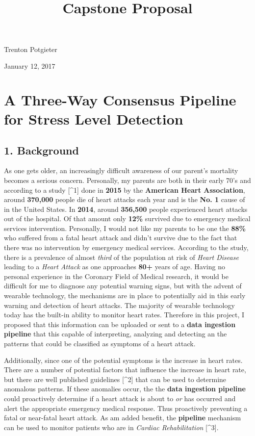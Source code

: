 \documentclass{scrreprt}
\title{Capstone Proposal}
\begin{document}
    
    
    
    
    

    
    

    Trenton Potgieter

January 12, 2017

\section{A Three-Way Consensus Pipeline for Stress Level
Detection}\label{a-three-way-consensus-pipeline-for-stress-level-detection}

\subsection{1. Background}\label{background}

As one gets older, an increasingly difficult awareness of our parent's
mortality becomes a serious concern. Personally, my parents are both in
their early 70's and according to a study {[}\^{}1{]} done in
\textbf{2015} by the \textbf{American Heart Association}, around
\textbf{370,000} people die of heart attacks each year and is the
\textbf{No. 1} cause of in the United States. In \textbf{2014}, around
\textbf{356,500} people experienced heart attacks out of the hospital.
Of that amount only \textbf{12\%} survived due to emergency medical
services intervention. Personally, I would not like my parents to be one
the \textbf{88\%} who suffered from a fatal heart attack and didn't
survive due to the fact that there was no intervention by emergency
medical services. According to the study, there is a prevalence of
almost \emph{third} of the population at risk of \emph{Heart Disease}
leading to a \emph{Heart Attack} as one approaches \textbf{80+} years of
age. Having no personal experience in the Coronary Field of Medical
research, it would be difficult for me to diagnose any potential warning
signs, but with the advent of wearable technology, the mechanisms are in
place to potentially aid in this early warning and detection of heart
attacks. The majority of wearable technology today has the built-in
ability to monitor heart rates. Therefore in this project, I proposed
that this information can be uploaded or sent to a \textbf{data
ingestion pipeline} that this capable of interpreting, analyzing and
detecting an the patterns that could be classified as symptoms of a
heart attack.

Additionally, since one of the potential symptoms is the increase in
heart rates. There are a number of potential factors that influence the
increase in heart rate, but there are well published guidelines
{[}\^{}2{]} that can be used to determine anomalous patterns. If these
anomalies occur, the the \textbf{data ingestion pipeline} could
proactively determine if a heart attack is about to \emph{or} has
occurred and alert the appropriate emergency medical response. Thus
proactively preventing a fatal or near-fatal heart attack. As am added
benefit, the \textbf{pipeline} mechanism can be used to monitor patients
who are in \emph{Cardiac Rehabilitation} {[}\^{}3{]}.
\end{document}
